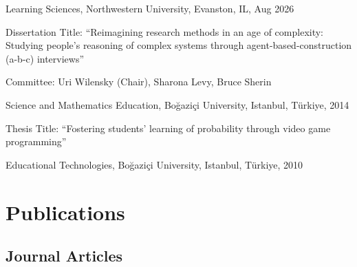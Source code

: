 \documentclass[11pt,letterpaper]{report} %
\begin{document}
    \begin{tablist}

        \item[Ph.D.] \tab{}Learning Sciences, Northwestern University, Evanston, IL, {\small Aug} 2026 \\

        \vspace{4pt}

        {\small Dissertation Title: \enquote{Reimagining research methods in an age of complexity: Studying people’s reasoning of complex systems through agent-based-construction (a-b-c) interviews}} \\

        \vspace{4pt}

        {\small Committee: Uri Wilensky (Chair), Sharona Levy, Bruce Sherin} \\

        \vspace{8pt}

        \item[M.S.]  \tab{}Science and Mathematics Education, Boğaziçi University, Istanbul, Türkiye, 2014 \\

        \vspace{4pt}

        {\small Thesis Title: \enquote{Fostering students' learning of probability through video game programming}} \\

        \vspace{8pt}

        \item[B.S.]  \tab{}Educational Technologies, Boğaziçi University, Istanbul, Türkiye, 2010

    \end{tablist}



    \section*{Publications}

    \subsection*{Journal Articles}
\end{document}

